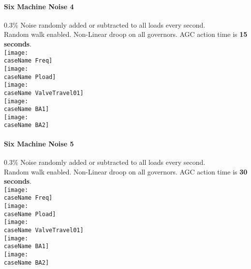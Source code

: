 \documentclass[12pt]{article}
\newcommand{\caseName}{ }
\begin{document}
\renewcommand{\caseName}{SixMachineNoise4}
\paragraph{Six Machine Noise 4} 0.3\% Noise randomly added or subtracted to all loads every second.\\ Random walk enabled.  Non-Linear droop on all governors. AGC action time is \textbf{15 seconds}.\\
	\texttt{[image: \\caseName Freq]} \\
	\texttt{[image: \\caseName Pload]} \\
	\texttt{[image: \\caseName ValveTravel01]} \\
	\texttt{[image: \\caseName BA1]}\\
	\texttt{[image: \\caseName BA2]} 
	
\pagebreak

\renewcommand{\caseName}{SixMachineNoise5}
\paragraph{Six Machine Noise 5} 0.3\% Noise randomly added or subtracted to all loads every second.\\ Random walk enabled.  Non-Linear droop on all governors. AGC action time is \textbf{30 seconds}.\\
	\texttt{[image: \\caseName Freq]} \\
	\texttt{[image: \\caseName Pload]} \\
	\texttt{[image: \\caseName ValveTravel01]} \\
	\texttt{[image: \\caseName BA1]}\\
	\texttt{[image: \\caseName BA2]} 
	
	
\end{document}
